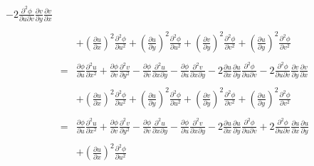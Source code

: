 \documentclass[10pt]{amsart}
\theoremstyle{nonumberplain}
\begin{document}
\begin{enumerate}[label={\bf {\arabic*}:}]
\begin{eqnarray*}
													-2 \frac{\partial^2 \phi}{\partial u \partial v} \frac{\partial v}{\partial y} \frac{\partial v}{\partial x} \\ \\
												   && +  \left(\frac{\partial u}{\partial x}\right)^2 \frac{\partial^2 \phi}{\partial u^2}
													+ \left(\frac{\partial u}{\partial y}\right)^2 \frac{\partial^2 \phi}{\partial u^2}
													+ \left(\frac{\partial v}{\partial y}\right)^2 \frac{\partial^2 \phi}{\partial v^2} 
													+  \left(\frac{\partial u}{\partial y}\right)^2\frac{\partial^2 \phi}{\partial v^2} \\ \\
												   &=& \frac{\partial\phi}{\partial u} \frac{\partial^2 u}{\partial x^2}
													+ \frac{\partial\phi}{\partial v} \frac{\partial^2 v}{\partial y^2} 
													- \frac{\partial\phi}{\partial v} \frac{\partial^2 u}{\partial x \partial y}
													- \frac{\partial\phi}{\partial u} \frac{\partial^2 v}{\partial x \partial y}
													-2 \frac{\partial u}{\partial x} \frac{\partial u}{\partial y} \frac{\partial^2 \phi}{\partial u \partial v}
													-2 \frac{\partial^2 \phi}{\partial u \partial v} \frac{\partial v}{\partial y} \frac{\partial v}{\partial x} \\ \\
												    && +  \left(\frac{\partial u}{\partial x}\right)^2 \frac{\partial^2 \phi}{\partial u^2}
												        	 + \left(\frac{\partial u}{\partial y}\right)^2 \frac{\partial^2 \phi}{\partial u^2}
													 + \left(\frac{\partial v}{\partial y}\right)^2 \frac{\partial^2 \phi}{\partial v^2} 
													 + \left(\frac{\partial u}{\partial y}\right)^2\frac{\partial^2 \phi}{\partial v^2} \\ \\
												&=& \frac{\partial\phi}{\partial u} \frac{\partial^2 u}{\partial x^2}
													+ \frac{\partial\phi}{\partial v} \frac{\partial^2 v}{\partial y^2} 
													- \frac{\partial\phi}{\partial v} \frac{\partial^2 u}{\partial x \partial y}
													- \frac{\partial\phi}{\partial u} \frac{\partial^2 v}{\partial x \partial y}
													-2 \frac{\partial u}{\partial x} \frac{\partial u}{\partial y} \frac{\partial^2 \phi}{\partial u \partial v}
													+2 \frac{\partial^2 \phi}{\partial u \partial v} \frac{\partial u}{\partial x} \frac{\partial u}{\partial y} \\ \\
												    && +  \left(\frac{\partial u}{\partial x}\right)^2 \frac{\partial^2 \phi}{\partial u^2}

\end{eqnarray*}
\end{enumerate}
\end{document}
